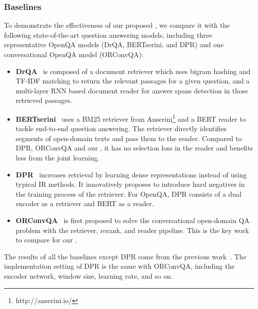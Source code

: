 \vspace{-0.1in}
\subsubsection{Baselines}
To demonstrate the effectiveness of our proposed {\modelname}, we compare it with the following state-of-the-art question answering models, including three representative OpenQA models (DrQA, BERTserini, and DPR) and one conversational OpenQA model (ORConvQA):
\begin{itemize}
    \item \textbf{DrQA}~\cite{chen2017reading} is composed of a document retriever which uses bigram hashing and TF-IDF matching to return the relevant passages for a given question, and a multi-layer RNN based document reader for answer spans detection in those retrieved passages.
    \item \textbf{BERTserini}~\cite{yang2019end} uses a BM25 retriever from Anserini\footnote{http://anserini.io/} and a BERT reader to tackle end-to-end question answering. The retriever directly identifies segments of open-domain texts and pass them to the reader. Compared to DPR, ORConvQA and our {\modelname}, it has no selection loss in the reader and benefits less from the joint learning.
    \item \textbf{DPR}~\cite{karpukhin2020dense} increases retrieval by learning dense representations instead of using typical IR methods. It innovatively proposes to introduce hard negatives in the training process of the retriever. For OpenQA, DPR consists of a dual encoder as a retriever and BERT as a reader. 
    \item \textbf{ORConvQA}~\cite{qu2020open} is first proposed to solve the conversational open-domain QA problem with the retriever, rerank, and reader pipeline. This is the key work to compare for our {\modelname}. 
\end{itemize}

The results of all the baselines except DPR come from the previous work~\cite{qu2020open}. The implementation setting of DPR is the same with ORConvQA, including the encoder network, window size, learning rate, and so on.

